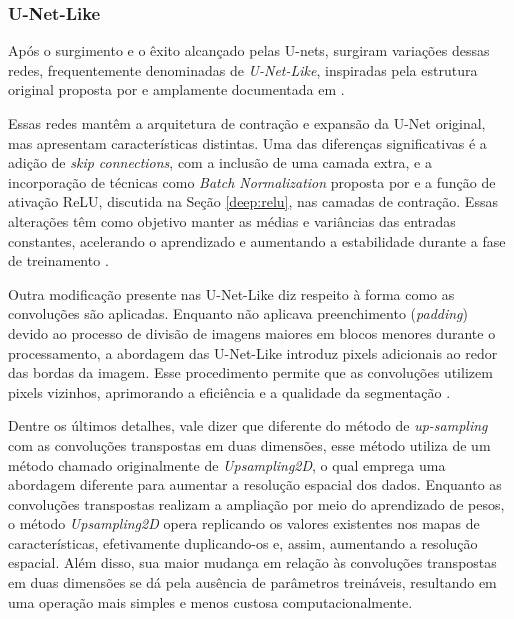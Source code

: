 \subsubsection{U-Net-Like}
\label{semantic:unetlike}
Após o surgimento e o êxito alcançado pelas U-nets, surgiram variações dessas redes, frequentemente denominadas de \textit{U-Net-Like}, inspiradas pela estrutura original proposta por \cite{Ronneberger2015U-net:Segmentation} e amplamente documentada em \citep{Kugelman2022ASegmentationb}.

Essas redes mantêm a arquitetura de contração e expansão da U-Net original, mas apresentam características distintas. Uma das diferenças significativas é a adição de \textit{skip connections}, com a inclusão de uma camada extra, e a incorporação de técnicas como \textit{Batch Normalization} proposta por \cite{Ioffe2015BatchShift} e a função de ativação ReLU, discutida na Seção \ref{deep:relu}, nas camadas de contração. Essas alterações têm como objetivo manter as médias e variâncias das entradas constantes, acelerando o aprendizado e aumentando a estabilidade durante a fase de treinamento \citep{Pfister2019AutomatedNetworks}.

Outra modificação presente nas U-Net-Like diz respeito à forma como as convoluções são aplicadas. Enquanto \cite{Ronneberger2015U-net:Segmentation} não aplicava preenchimento (\textit{padding}) devido ao processo de divisão de imagens maiores em blocos menores durante o processamento, a abordagem das U-Net-Like introduz pixels adicionais ao redor das bordas da imagem. Esse procedimento permite que as convoluções utilizem pixels vizinhos, aprimorando a eficiência e a qualidade da segmentação \citep{Pfister2019AutomatedNetworks}.

Dentre os últimos detalhes, vale dizer que diferente do método de \textit{up-sampling} com as convoluções transpostas em duas dimensões, esse método utiliza de um método chamado originalmente de \textit{Upsampling2D}, o qual emprega uma abordagem diferente para aumentar a resolução espacial dos dados. Enquanto as convoluções transpostas realizam a ampliação por meio do aprendizado de pesos, o método \textit{Upsampling2D} opera replicando os valores existentes nos mapas de características, efetivamente duplicando-os e, assim, aumentando a resolução espacial. Além disso, sua maior mudança em relação às convoluções transpostas em duas dimensões se dá pela ausência de parâmetros treináveis, resultando em uma operação mais simples e menos custosa computacionalmente.

